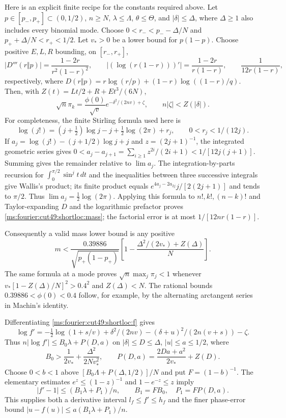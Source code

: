 Here is an explicit finite recipe for the constants required above.
Let $p\in[p_-,p_+]\subset(0,1/2)$, $n\ge N$, $\lambda\le\Lambda$,
$\theta\le\Theta$, and $|\delta|\le\Delta$, where $\Delta\ge1$ also includes
every binomial mode. Choose $0<r_-<p_- -\Delta/N$ and
$p_++\Delta/N<r_+<1/2$. Let $v_*>0$ be a lower bound for $p(1-p)$.
Choose positive $E,L,R$ bounding, on $[r_-,r_+]$,
\[
 |D'''(r\Vert p)|=\frac{1-2r}{r^2(1-r)^2},\qquad
 |(\log(r(1-r)))'|=\frac{1-2r}{r(1-r)},\qquad
 \frac1{12r(1-r)},
\]
respectively, where $D(r\Vert p)=r\log(r/p)+(1-r)\log((1-r)/q)$.
Then, with $Z(t)=Lt/2+R+Et^3/(6N)$,
\begin{equation}\label{ms:fourier:cut49:shortloc:mass}
 \sqrt n\pi_k=\frac{\phi(0)}{\sqrt v}
       e^{-\delta^2/(2nv)+\zeta},\qquad n|\zeta|<Z(|\delta|).
\end{equation}
For completeness, the finite Stirling formula used here is
\[
 \log(j!)=(j+\tfrac12)\log j-j+\tfrac12\log(2\pi)+r_j,
 \qquad 0<r_j<1/(12j).
\]
If $a_j=\log(j!)-(j+1/2)\log j+j$ and $z=(2j+1)^{-1}$, the integrated
geometric series gives
$0<a_j-a_{j+1}=\sum_{i\ge1}z^{2i}/(2i+1)<1/[12j(j+1)]$.
Summing gives the remainder relative to $\lim a_j$. The integration-by-parts
recursion for $\int_0^{\pi/2}\sin^j t\,dt$ and the inequalities between three
successive integrals give Wallis's product; its finite product equals
$e^{4a_j-2a_{2j}}j/[2(2j+1)]$ and tends to $\pi/2$. Thus
$\lim a_j=\tfrac12\log(2\pi)$. Applying this formula to $n!,k!,(n-k)!$
and Taylor-expanding $D$ and the logarithmic prefactor proves
\eqref{ms:fourier:cut49:shortloc:mass}; the factorial error is at most $1/[12nr(1-r)]$.

Consequently a valid mass lower bound is any positive
\begin{equation}\label{ms:fourier:cut49:shortloc:m}
 m<\frac{0.39886}{\sqrt{p_+(1-p_+)}}
          \left[1-\frac{\Delta^2/(2v_*)+Z(\Delta)}N\right].
\end{equation}
The same formula at a mode proves $\sqrt n\max_j\pi_j<1$ whenever
$v_*[1-Z(\Delta)/N]^2>0.4^2$ and $Z(\Delta)<N$.
The rational bounds $0.39886<\phi(0)<0.4$ follow, for example, by the
alternating arctangent series in Machin's identity.

Differentiating \eqref{ms:fourier:cut49:shortloc:f} gives
\begin{equation}\label{ms:fourier:cut49:shortloc:logder}
 \log f'=-\tfrac12\log(1+s/v)+\delta^2/(2nv)
                   -(\delta+u)^2/(2n(v+s))-\zeta.
\end{equation}
Thus $n|\log f'|\le B_0\lambda+P(D,a)$ on $|\delta|\le D\le\Delta$,
$|u|\le a\le1/2$, where
\[
 B_0>\frac1{2v_*}+\frac{\Delta^2}{2Nv_*^2},\qquad
 P(D,a)=\frac{2Da+a^2}{2v_*}+Z(D).
\]
Choose $0<b<1$ above $[B_0\Lambda+P(\Delta,1/2)]/N$ and put
$F=(1-b)^{-1}$. The elementary estimates $e^z\le(1-z)^{-1}$ and
$1-e^{-z}\le z$ imply
\begin{equation}\label{ms:fourier:cut49:shortloc:derivative}
 |f'-1|\le(B_1\lambda+P_1)/n,\qquad B_1=FB_0,\quad P_1=FP(D,a).
\end{equation}
This supplies both a derivative interval $l_f\le f'\le h_f$ and the
finer phase-error bound $|u-f(u)|\le a(B_1\lambda+P_1)/n$.

